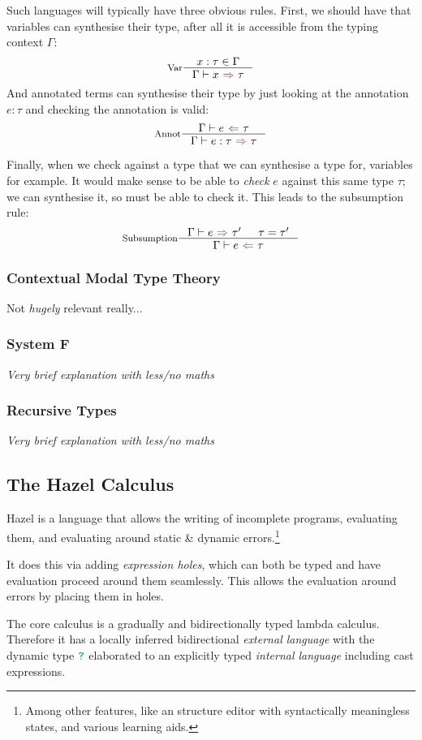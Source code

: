 Such languages will typically have three obvious rules. First, we should have that variables can synthesise their type, after all it is accessible from the typing context $\Gamma$:
\[\inference[Var]{x : \tau \in \Gamma}{\synthesis{x}{\tau}}\]
And annotated terms can synthesise their type by just looking at the annotation $e : \tau$ and checking the annotation is valid:
\[\inference[Annot]{\analysis{e}{\tau}}{\synthesis{e : \tau}{\tau}}\]

Finally, when we check against a type that we can synthesise a type for, variables for example.
It would make sense to be able to \textit{check} $e$ against this same type $\tau$; we can synthesise it, so must be able to check it. This leads to the subsumption rule:
\[\inference[Subsumption]{\synthesis{e}{\tau'} & \tau = \tau'}{\analysis{e}{\tau}}\]

\subsubsection{Contextual Modal Type Theory}\label{sec:CMTT}
Not \textit{hugely} relevant really...

\subsubsection{System F}\label{sec:System F}
\textit{Very brief explanation with less/no maths}

\subsubsection{Recursive Types}\label{sec:Recursive Types}
\textit{Very brief explanation with less/no maths}

\subsection{The Hazel Calculus}\label{sec:CoreHazel}
Hazel is a language that allows the writing of incomplete programs, evaluating them, and evaluating around static \& dynamic errors.\footnote{Among other features, like an structure editor with syntactically meaningless states, and various learning aids.}

It does this via adding \textit{expression holes}, which can both be typed and have evaluation proceed around them seamlessly. This allows the evaluation around errors by placing them in holes.

The core calculus \cite{HazelLivePaper} is a gradually and bidirectionally typed lambda calculus. Therefore it has a locally inferred bidirectional \textit{external language} with the dynamic type ${\color{teal}\texttt{?}}$ elaborated to an explicitly typed \textit{internal language} including cast expressions. 

